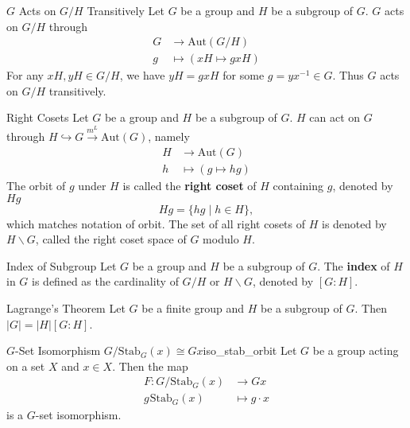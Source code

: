 \begin{example}{$G$ Acts on $G/H$ Transitively}{}
    Let $G$ be a group and $H$ be a subgroup of $G$. $G$ acts on $G/H$ through
    \begin{align*}
        G & \longrightarrow \mathrm{Aut}(G/H) \\
        g & \longmapsto  (xH\longmapsto gxH)
    \end{align*}
    For any $xH,yH\in G/H$, we have $yH=gxH$ for some $g=yx^{-1}\in G$. Thus $G$ acts on $G/H$ transitively.
\end{example}

\begin{definition}{Right Cosets}{}
    Let $G$ be a group and $H$ be a subgroup of $G$. $H$ can act on $G$ through $H\hookrightarrow G\stackrel{m^L}{\longrightarrow} \mathrm{Aut}(G)$, namely
    \begin{align*}
        H & \longrightarrow \mathrm{Aut}(G) \\
        h & \longmapsto  (g\longmapsto hg)
    \end{align*}
    The orbit of $g$ under $H$ is called the \textbf{right coset} of $H$ containing $g$, denoted by $Hg$
    \[
        Hg = \{ hg\mid h\in H\},
    \]
    which matches notation of orbit. The set of all right cosets of $H$ is denoted by $H\backslash G$, called the right coset space of $G$ modulo $H$.
\end{definition}

\begin{definition}{Index of Subgroup}{}
    Let $G$ be a group and $H$ be a subgroup of $G$. The \textbf{index} of $H$ in $G$ is defined as the cardinality of $G/H$ or $H\backslash G$, denoted by $[G:H]$.
\end{definition}

\begin{theorem}{Lagrange's Theorem}{}
    Let $G$ be a finite group and $H$ be a subgroup of $G$. Then $|G|=|H|[G:H]$.
\end{theorem}


\begin{proposition}{$G$-Set Isomorphism $G/\mathrm{Stab}_G(x)\cong Gx$}{iso_stab_orbit}
    Let $G$ be a group acting on a set $X$ and $x\in X$. Then the map
    \begin{align*}
        F:G/\mathrm{Stab}_G(x)          & \longrightarrow Gx   \\
        g\hspace{1pt}\mathrm{Stab}_G(x) & \longmapsto g\cdot x
    \end{align*}
    is a $G$-set isomorphism.
\end{proposition}

